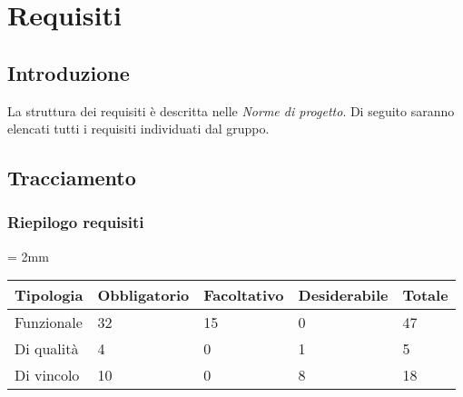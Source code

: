 \section{Requisiti}

    \subsection{Introduzione}
    La struttura dei requisiti è descritta nelle \emph{Norme di progetto}. Di seguito saranno elencati tutti i requisiti individuati dal gruppo. 
    
    
    
    
    
    
    \subsection{Tracciamento}
    
    
    \subsubsection{Riepilogo requisiti}
    
    \tabulinesep = 2mm %
    \begin{longtabu} to \textwidth {| X | X | X | X | X |} %
    \hline
        
    \textbf{Tipologia} & \textbf{Obbligatorio} & \textbf{Facoltativo} & \textbf{Desiderabile} & \textbf{Totale} \\
    \hline
    Funzionale & 32 & 15 & 0 & 47\\
    \hline
    Di qualità & 4 & 0 & 1 & 5\\
    \hline
    Di vincolo & 10 & 0 & 8 & 18\\
    \hline
    
    \end{longtabu}






